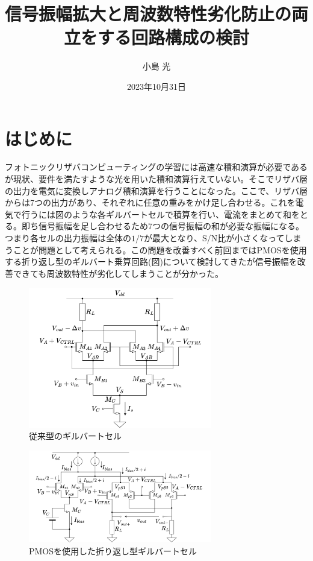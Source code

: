 \documentclass[twocolumn]{jsarticle}
\begin{document}
\title{信号振幅拡大と周波数特性劣化防止の両立をする回路構成の検討}
\author{小島 光}
\date{2023年10月31日}
\maketitle

\section{はじめに}
    フォトニックリザバコンピューティングの学習には高速な積和演算が必要であるが現状、要件を満たすような光を用いた積和演算行えていない。そこでリザバ層の出力を電気に変換しアナログ積和演算を行うことになった。ここで、リザバ層からは7つの出力があり、それぞれに任意の重みをかけ足し合わせる。これを電気で行うには図のような各ギルバートセルで積算を行い、電流をまとめて和をとる。即ち信号振幅を足し合わせるため7つの信号振幅の和が必要な振幅になる。つまり各セルの出力振幅は全体の$1/7$が最大となり、S/N比が小さくなってしまうことが問題として考えられる。この問題を改善すべく前回まではPMOSを使用する折り返し型のギルバート乗算回路(図)について検討してきたが信号振幅を改善できても周波数特性が劣化してしまうことが分かった。
    \begin{figure}[h]
        \begin{center}
            \includegraphics*[width=80mm]{figures/gilbert.png}
            \caption{従来型のギルバートセル}
            \label{fig:gilbert_conv}
        \end{center}
    \end{figure}
    \begin{figure}[H]
            \includegraphics*[width=80mm]{figures/folded_gilbert.png}
            \caption{PMOSを使用した折り返し型ギルバートセル}
            \label{fig:gilbert_folded_NtoP}
    \end{figure}
\end{document}
